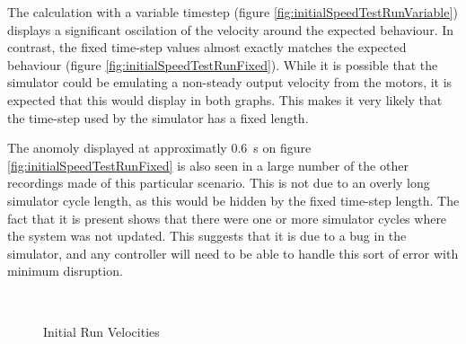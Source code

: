 \documentclass[10pt]{article} \usepackage[a4paper]{geometry}
\begin{document}
The calculation with a variable timestep (figure
\ref{fig:initialSpeedTestRunVariable}) displays a significant oscilation of the
velocity around the expected behaviour.  In contrast, the fixed time-step values
almost exactly matches the expected behaviour (figure
\ref{fig:initialSpeedTestRunFixed}).  While it is possible that the simulator
could be emulating a non-steady output velocity from the motors, it is expected
that this would display in both graphs.  This makes it very likely that the
time-step used by the simulator has a fixed length.

The anomoly displayed at approximatly \SI{0.6}{\second} on figure
\ref{fig:initialSpeedTestRunFixed} is also seen in a large number of the other
recordings made of this particular scenario.  This is not due to an overly long
simulator cycle length, as this would be hidden by the fixed time-step length.
The fact that it is present shows that there were one or more simulator cycles
where the system was not updated.  This suggests that it is due to a bug in the
simulator, and any controller will need to be able to handle this sort of error
with minimum disruption.

\begin{figure}
 \centering
 \\
 \caption{Initial Run Velocities}
 \label{fig:initialSpeedTestRun}
\end{figure}
\end{document}
